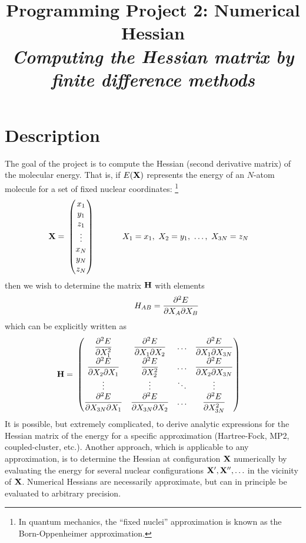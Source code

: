 \documentclass[11pt]{article}
\title{Programming Project 2: Numerical Hessian\\
\textit{Computing the Hessian matrix by finite difference methods}}
\date{}
\begin{document}
\maketitle

\section*{Description}

The goal of the project is to compute the Hessian (second derivative matrix) of
the molecular energy. That is, if $E(\mathbf{X})$ represents the energy of an
$N$-atom molecule for a set of fixed nuclear coordinates: \footnote{In quantum
mechanics, the ``fixed nuclei'' approximation is known as the Born-Oppenheimer
approximation.}
\begin{align}
    \mathbf{X} =&\ \left(\begin{matrix}x_1\\y_1\\z_1\\\vdots\\x_N\\y_N\\z_N\end{matrix}\right)\ \ \ \ \ \ \ \ \ \ 
    X_1=x_1,\ X_2=y_1,\ \ldots,\ X_{3N}=z_N
\end{align}
then we wish to determine the matrix $\mathbf{H}$ with elements
\begin{align}
    \ \ \ \ \ \ \ \ \ \  H_{AB} = \dfrac{\partial^2E}{\partial X_A\partial X_B}
\end{align}
which can be explicitly written as
\begin{align}
    \bo{H} =&\ 
    \ma{
            \fr{\pt^2E}{\pt X_1^2}     &   \fr{\pt^2E}{\pt X_1\pt X_2}  &  \ldots  & \fr{\pt^2E}{\pt X_1\pt X_{3N}} \\
          \fr{\pt^2E}{\pt X_2\pt X_1}  &     \fr{\pt^2E}{\pt X_2^2}     &  \ldots  & \fr{\pt^2E}{\pt X_2\pt X_{3N}} \\
                    \vdots             &             \vdots             &  \ddots  &             \vdots             \\
        \fr{\pt^2E}{\pt X_{3N}\pt X_1} & \fr{\pt^2E}{\pt X_{3N}\pt X_2} &  \ldots  &   \fr{\pt^2E}{\pt X_{3N}^2}     }
    \label{H}
\end{align}
It is possible, but extremely complicated, to derive analytic expressions for
the Hessian matrix of the energy for a specific approximation (Hartree-Fock,
MP2, coupled-cluster, etc.). Another approach, which is applicable to any
approximation, is to determine the Hessian at configuration $\mathbf{X}$
numerically by evaluating the energy for several nuclear configurations
$\mathbf{X}',\mathbf{X}'',\ldots$ in the vicinity of $\mathbf{X}$. Numerical Hessians are
necessarily approximate, but can in principle be evaluated to arbitrary
precision.
\end{document}

